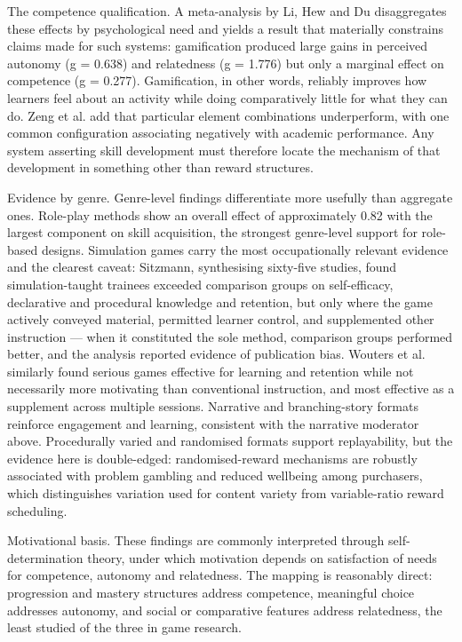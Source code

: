 The competence qualification. A meta-analysis by Li, Hew and Du\cite{r33} disaggregates these effects by psychological need and yields a result that materially constrains claims made for such systems: gamification produced large gains in perceived autonomy (g = 0.638) and relatedness (g = 1.776) but only a marginal effect on competence (g = 0.277). Gamification, in other words, reliably improves how learners feel about an activity while doing comparatively little for what they can do. Zeng et al.\cite{r34} add that particular element combinations underperform, with one common configuration associating negatively with academic performance. Any system asserting skill development must therefore locate the mechanism of that development in something other than reward structures.

Evidence by genre. Genre-level findings differentiate more usefully than aggregate ones. Role-play methods show an overall effect of approximately 0.82 with the largest component on skill acquisition\cite{r35}, the strongest genre-level support for role-based designs. Simulation games carry the most occupationally relevant evidence and the clearest caveat: Sitzmann\cite{r36}, synthesising sixty-five studies, found simulation-taught trainees exceeded comparison groups on self-efficacy, declarative and procedural knowledge and retention, but only where the game actively conveyed material, permitted learner control, and supplemented other instruction --- when it constituted the sole method, comparison groups performed better, and the analysis reported evidence of publication bias. Wouters et al.\cite{r37} similarly found serious games effective for learning and retention while not necessarily more motivating than conventional instruction, and most effective as a supplement across multiple sessions. Narrative and branching-story formats reinforce engagement and learning\cite{r38}, consistent with the narrative moderator above. Procedurally varied and randomised formats support replayability, but the evidence here is double-edged: randomised-reward mechanisms are robustly associated with problem gambling and reduced wellbeing among purchasers\cite{r39}, which distinguishes variation used for content variety from variable-ratio reward scheduling.

Motivational basis. These findings are commonly interpreted through self-determination theory\cite{r40}, under which motivation depends on satisfaction of needs for competence, autonomy and relatedness. The mapping is reasonably direct: progression and mastery structures address competence, meaningful choice addresses autonomy, and social or comparative features address relatedness, the least studied of the three in game research.

